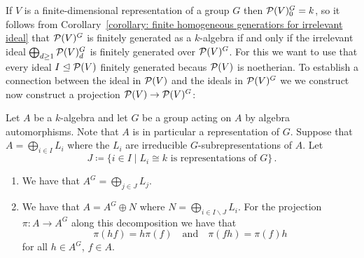 \begin{fluff}
  If $V$ is a finite-dimensional representation of a group $G$ then $\mathcal{P}(V)^G_0 = k$, so it follows from Corollary~\ref{corollary: finite homogeneous generatiors for irrelevant ideal} that $\mathcal{P}(V)^G$ is finitely generated as a $k$-algebra if and only if the irrelevant ideal $\bigoplus_{d \geq 1} \mathcal{P}(V)^G_d$ is finitely generated over $\mathcal{P}(V)^G$.
  For this we want to use that every ideal $I \trianglelefteq \mathcal{P}(V)$ finitely generated becaus $\mathcal{P}(V)$ is noetherian.
  To establish a connection between the ideal in $\mathcal{P}(V)$ and the ideals in $\mathcal{P}(V)^G$ we we construct now construct a projection $\mathcal{P}(V) \to \mathcal{P}(V)^G$:
\end{fluff}


\begin{lemma}
  \label{lemma: projection reynold operator}
  Let $A$ be a $k$-algebra and let $G$ be a group acting on $A$ by algebra automorphisms.
  Note that $A$ is in particular a representation of $G$.
  Suppose that $A = \bigoplus_{i \in I} L_i$ where the $L_i$ are irreducible $G$-subrepresentations of $A$.
  Let
  \[
              J
    \coloneqq \{
                i \in I
              \mid
                \text{$L_i \cong k$ is representations of $G$}
              \} \,.
  \]
  \begin{enumerate}
    \item
      We have that $A^G = \bigoplus_{j \in J} L_j$.
    \item
      We have that $A = A^G \oplus N$ where $N = \bigoplus_{i \in I \smallsetminus J} L_i$.
      For the projection $\pi \colon A \to A^G$ along this decomposition we have that
      \begin{equation}
        \label{equation: reynolds operator}
          \pi(hf)
        = h\pi(f)
        \quad\text{and}\quad
          \pi(fh)
        = \pi(f) h
      \end{equation}
      for all $h \in A^G$, $f \in A$.
  \end{enumerate}
\end{lemma}


